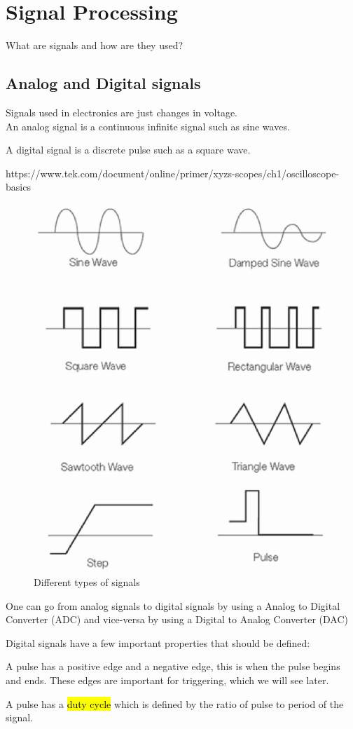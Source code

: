\documentclass{article}
\begin{document}
\pagebreak
\section{Signal Processing}
What are signals and how are they used?
\subsection{Analog and Digital signals}
Signals used in electronics are just changes in voltage. 
\\
An analog signal is a continuous infinite signal such as sine waves.

A digital signal is a discrete pulse such as a square wave.


https://www.tek.com/document/online/primer/xyzs-scopes/ch1/oscilloscope-basics

\begin{figure}[!phbt]
    \centering
    \includegraphics[width=0.45\linewidth]{img/different_pulses.eps}
    \caption{Different types of signals}
    \label{fig:signals}
\end{figure}

One can go from analog signals to digital signals by using a Analog to Digital Converter (ADC) and vice-versa by using a Digital to Analog Converter (DAC)

Digital signals have a few important properties that should be defined:

A pulse has a positive edge and a negative edge, this is when the pulse begins and ends. These edges are important for triggering, which we will see later.

A pulse has a \hl{duty cycle} which is defined by the ratio of pulse to period of the signal.
\end{document}
